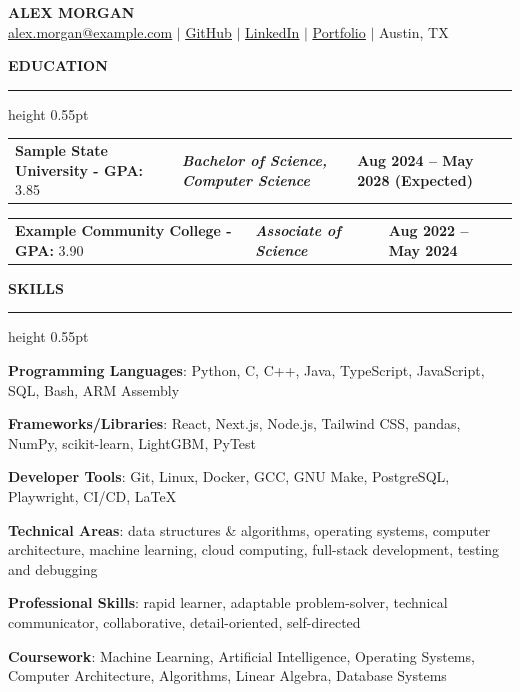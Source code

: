 \documentclass[10pt,letterpaper]{article}
\makeatletter
\newcommand{\ressection}[1]{%
  \vspace{1.8pt}%
  {\fontsize{11.1}{11.9}\selectfont\bfseries\MakeUppercase{#1}}\par
  \vspace{0.35pt}\hrule height 0.55pt\vspace{3.0pt}%
}
\newcommand{\eduline}[3]{%
  {\fontsize{10.1}{11.15}\selectfont
  \begin{tabularx}{\textwidth}{@{}X >{\centering\arraybackslash\itshape\bfseries}p{0.36\textwidth} >{\raggedleft\arraybackslash\bfseries}p{0.265\textwidth}@{}}
    #1 & #2 & #3
  \end{tabularx}}\vspace{-0.1pt}%
}
\newcommand{\skillline}[2]{%
  {\fontsize{10.0}{12.0}\selectfont\RaggedRight\textbf{#1}: #2\par}\vspace{0.15pt}%
}
\makeatother
\begin{document}
\begin{center}
{\fontsize{14.2}{14.9}\selectfont\bfseries ALEX MORGAN}\\[-0.1pt]
{\fontsize{10.5}{11.4}\selectfont
\href{mailto:alex.morgan@example.com}{\underline{alex.morgan@example.com}} $|$
\href{https://example.com/github}{\underline{GitHub}} $|$
\href{https://example.com/linkedin}{\underline{LinkedIn}} $|$
\href{https://example.com/portfolio}{\underline{Portfolio}} $|$ Austin, TX}
\end{center}
\vspace{-6pt}

\ressection{Education}
\eduline{\textbf{Sample State University - GPA:} 3.85}{Bachelor of Science, Computer Science}{Aug 2024 -- May 2028 (Expected)}
\eduline{\textbf{Example Community College - GPA:} 3.90}{Associate of Science}{Aug 2022 -- May 2024}

\ressection{Skills}
\skillline{Programming Languages}{Python, C, C++, Java, TypeScript, JavaScript, SQL, Bash, ARM Assembly}
\skillline{Frameworks/Libraries}{React, Next.js, Node.js, Tailwind CSS, pandas, NumPy, scikit-learn, LightGBM, PyTest}
\skillline{Developer Tools}{Git, Linux, Docker, GCC, GNU Make, PostgreSQL, Playwright, CI/CD, LaTeX}
\skillline{Technical Areas}{data structures \& algorithms, operating systems, computer architecture, machine learning, cloud computing, full-stack development, testing and debugging}
\skillline{Professional Skills}{rapid learner, adaptable problem-solver, technical communicator, collaborative, detail-oriented, self-directed}
\skillline{Coursework}{Machine Learning, Artificial Intelligence, Operating Systems, Computer Architecture, Algorithms, Linear Algebra, Database Systems}
\end{document}
